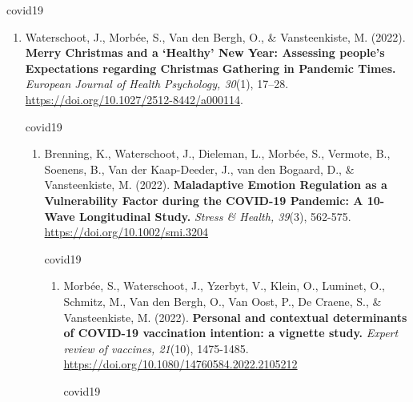 \documentclass[
  twocolumn]{article}
\providecommand{\tightlist}{%
  \setlength{\itemsep}{0pt}\setlength{\parskip}{0pt}}
\begin{document}
\begin{enumerate}
\begin{enumerate}
\begin{enumerate}
\begin{enumerate}
\begin{enumerate}
\begin{enumerate}
\begin{enumerate}
\begin{enumerate}
                covid19

                \begin{enumerate}
                \def\labelenumix{\arabic{enumix}.}
                \tightlist
                \item
                  Waterschoot, J., Morbée, S., Van den Bergh, O., \&
                  Vansteenkiste, M. (2022). \textbf{Merry Christmas and
                  a `Healthy' New Year: Assessing people's Expectations
                  regarding Christmas Gathering in Pandemic Times.}
                  \emph{European Journal of Health Psychology, 30}(1),
                  17--28.
                  \url{https://doi.org/10.1027/2512-8442/a000114}.

                  covid19

                  \begin{enumerate}
                  \def\labelenumx{\arabic{enumx}.}
                  \tightlist
                  \item
                    Brenning, K., Waterschoot, J., Dieleman, L., Morbée,
                    S., Vermote, B., Soenens, B., Van der Kaap-Deeder,
                    J., van den Bogaard, D., \& Vansteenkiste, M.
                    (2022). \textbf{Maladaptive Emotion Regulation as a
                    Vulnerability Factor during the COVID-19 Pandemic: A
                    10-Wave Longitudinal Study.} \emph{Stress \& Health,
                    39}(3), 562-575.
                    \url{https://doi.org/10.1002/smi.3204}

                    covid19

                    \begin{enumerate}
                    \def\labelenumxi{\arabic{enumxi}.}
                    \tightlist
                    \item
                      Morbée, S., Waterschoot, J., Yzerbyt, V., Klein,
                      O., Luminet, O., Schmitz, M., Van den Bergh, O.,
                      Van Oost, P., De Craene, S., \& Vansteenkiste, M.
                      (2022). \textbf{Personal and contextual
                      determinants of COVID-19 vaccination intention: a
                      vignette study.} \emph{Expert review of vaccines,
                      21}(10), 1475-1485.
                      \url{https://doi.org/10.1080/14760584.2022.2105212}

                      covid19


\end{enumerate}
\end{enumerate}
\end{enumerate}
\end{enumerate}
\end{enumerate}
\end{enumerate}
\end{enumerate}
\end{enumerate}
\end{enumerate}
\end{enumerate}
\end{enumerate}
\end{document}

